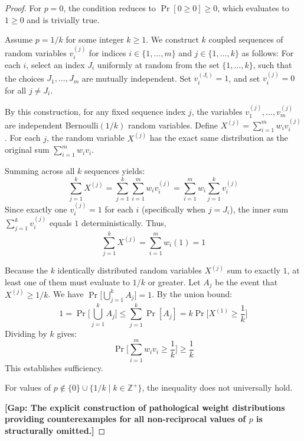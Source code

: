 \documentclass[12pt]{article}
\begin{document}
\begin{proof}
For $p = 0$, the condition reduces to $\Pr[0 \ge 0] \ge 0$, which evaluates to $1 \ge 0$ and is trivially true.

Assume $p = 1/k$ for some integer $k \ge 1$. 
We construct $k$ coupled sequences of random variables $v_i^{(j)}$ for indices $i \in \{1, \dots, m\}$ and $j \in \{1, \dots, k\}$ as follows:
For each $i$, select an index $J_i$ uniformly at random from the set $\{1, \dots, k\}$, such that the choices $J_1, \ldots, J_m$ are mutually independent. 
Set $v_i^{(J_i)} = 1$, and set $v_i^{(j)} = 0$ for all $j \neq J_i$.

By this construction, for any fixed sequence index $j$, the variables $v_1^{(j)}, \ldots, v_m^{(j)}$ are independent Bernoulli$(1/k)$ random variables. 
Define $X^{(j)} = \sum_{i=1}^m w_i v_i^{(j)}$. 
For each $j$, the random variable $X^{(j)}$ has the exact same distribution as the original sum $\sum_{i=1}^m w_i v_i$.

Summing across all $k$ sequences yields:
\[\sum_{j=1}^k X^{(j)} = \sum_{j=1}^k \sum_{i=1}^m w_i v_i^{(j)} = \sum_{i=1}^m w_i \sum_{j=1}^k v_i^{(j)}\]
Since exactly one $v_i^{(j)} = 1$ for each $i$ (specifically when $j = J_i$), the inner sum $\sum_{j=1}^k v_i^{(j)}$ equals $1$ deterministically.
Thus,
\[\sum_{j=1}^k X^{(j)} = \sum_{i=1}^m w_i (1) = 1\]

Because the $k$ identically distributed random variables $X^{(j)}$ sum to exactly $1$, at least one of them must evaluate to $1/k$ or greater. 
Let $A_j$ be the event that $X^{(j)} \ge 1/k$. We have $\Pr\Big[\bigcup_{j=1}^k A_j\Big] = 1$.
By the union bound:
\[ 1 = \Pr\Big[\bigcup_{j=1}^k A_j\Big] \le \sum_{j=1}^k \Pr[A_j] = k \Pr\Big[X^{(1)} \ge \frac{1}{k}\Big] \]
Dividing by $k$ gives:
\[ \Pr\Big[\sum_{i=1}^m w_i v_i \ge \frac{1}{k}\Big] \ge \frac{1}{k} \]
This establishes sufficiency.

For values of $p \notin \{0\} \cup \{1/k \mid k \in \mathbb{Z}^+\}$, the inequality does not universally hold.

\vspace{\baselineskip}
\noindent\textbf{[Gap: The explicit construction of pathological weight distributions providing counterexamples for all non-reciprocal values of $p$ is structurally omitted.]}
\end{proof}
\end{document}
